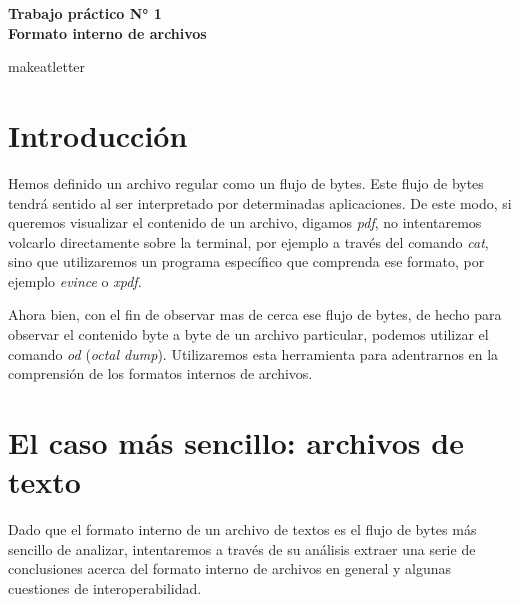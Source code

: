 \documentclass[12pt]{article}
\def\maketitle{

\makeatletter
{\color{bl} \centering \huge \sc \textbf{ Trabajo práctico N° 1\\ \large
\vspace*{-8pt} \color{black} Formato interno de archivos \vspace*{8pt} }\par}
\makeatother

makeatletter


}
\begin{document}
\thispagestyle{empty}
\maketitle
\setlength{\parindent}{0pt}


\section*{Introducción}

Hemos definido un archivo regular como un flujo de bytes. Este flujo de bytes
tendrá sentido al ser interpretado por determinadas aplicaciones. De este
modo, si queremos visualizar el contenido de un archivo, digamos \emph{pdf},
no intentaremos volcarlo directamente sobre la terminal, por ejemplo a través
del comando \emph{cat}, sino que utilizaremos un programa específico que
comprenda ese formato, por ejemplo \emph{evince} o \emph{xpdf}. 

Ahora bien, con el fin de observar mas de cerca ese flujo de bytes, de hecho
para observar el contenido byte a byte de un archivo particular, podemos
utilizar el comando \emph{od} (\emph{octal dump}). Utilizaremos esta
herramienta para adentrarnos en la comprensión de los formatos internos de
archivos.

\section*{El caso más sencillo: archivos de texto}

Dado que el formato interno de un archivo de textos es el flujo de bytes más
sencillo de analizar, intentaremos a través de su análisis extraer una serie 
de conclusiones acerca del formato interno de archivos en general y algunas 
cuestiones de interoperabilidad. 
\end{document}
